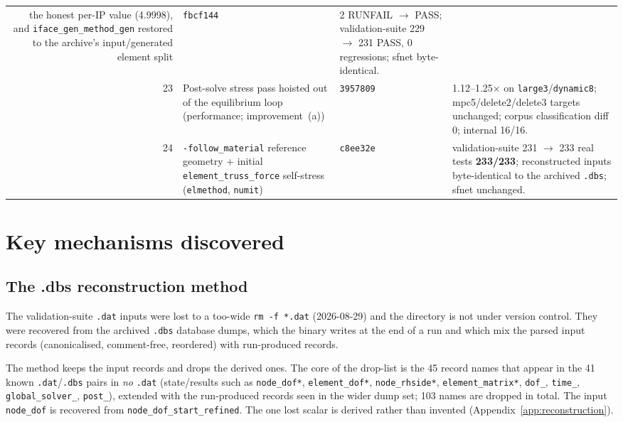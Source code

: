 \documentclass[11pt,a4paper]{report}
\newcommand{\code}[1]{\texttt{#1}}
\begin{document}
\begin{longtable}{@{}r L{5.0cm} L{2.6cm} L{5.6cm}@{}}
     the honest per-IP value (4.9998), and \code{iface\_\allowbreak gen\_\allowbreak method\_\allowbreak gen} restored
     to the archive's input/generated element split
   & \code{fbcf144}
   & 2 RUNFAIL $\rightarrow$ PASS; validation-suite 229 $\rightarrow$ 231 PASS, 0
     regressions; sfnet byte-identical. \\
23 & Post-solve stress pass hoisted out of the equilibrium loop (performance;
     improvement~(a))
   & \code{3957809}
   & 1.12--1.25$\times$ on \code{large3}/\code{dynamic8}; mpc5/delete2/delete3
     targets unchanged; corpus classification diff 0; internal 16/16. \\
24 & \code{-follow\_\allowbreak material} reference geometry + initial
     \code{element\_\allowbreak truss\_\allowbreak force} self-stress (\code{elmethod}, \code{numit})
   & \code{c8ee32e}
   & validation-suite 231 $\rightarrow$ 233 real tests \textbf{233/233};
     reconstructed inputs byte-identical to the archived \code{.dbs}; sfnet
     unchanged. \\
\end{longtable}

\chapter{Key mechanisms discovered}
\label{ch:mechanisms}

\section{The .dbs reconstruction method}
\label{sec:dbs-method}

The validation-suite \code{.dat} inputs were lost to a too-wide \code{rm -f
*.dat} (2026-08-29) and the directory is not under version control. They were
recovered from the archived \code{.dbs} database dumps, which the binary writes
at the end of a run and which mix the parsed input records (canonicalised,
comment-free, reordered) with run-produced records.

The method keeps the input records and drops the derived ones. The core of the
drop-list is the 45 record names that appear in the 41 known \code{.dat}/\code{.dbs}
pairs in \emph{no} \code{.dat} (state/results such as \code{node\_\allowbreak dof*},
\code{element\_\allowbreak dof*}, \code{node\_\allowbreak rhside*}, \code{element\_\allowbreak matrix*}, \code{dof\_\allowbreak *},
\code{time\_\allowbreak *}, \code{global\_\allowbreak solver\_\allowbreak *}, \code{post\_\allowbreak *}), extended with the
run-produced records seen in the wider dump set; 103 names are dropped in total.
The input \code{node\_\allowbreak dof} is recovered from \code{node\_\allowbreak dof\_\allowbreak start\_\allowbreak refined}. The
one lost scalar is derived rather than invented (Appendix~\ref{app:reconstruction}).
\end{document}
